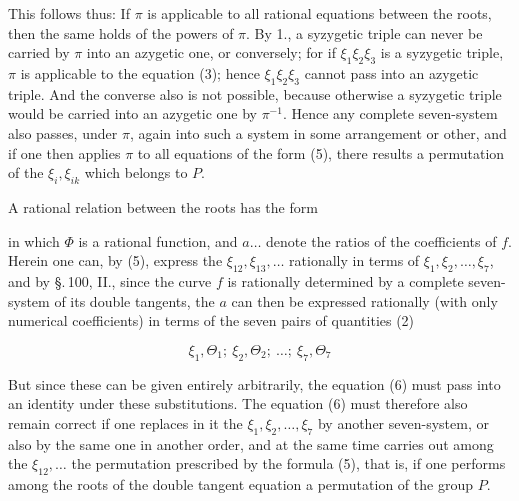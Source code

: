 
This follows thus: If $\pi$ is applicable to all rational equations between the roots, then the same holds of the powers of $\pi$. By 1., a syzygetic triple can never be carried by $\pi$ into an azygetic one, or conversely; for if $\xi_1\xi_2\xi_3$ is a syzygetic triple, $\pi$ is applicable to the equation (3); hence $\xi_1\xi_2\xi_3$ cannot pass into an azygetic triple. And the converse also is not possible, because otherwise a syzygetic triple would be carried into an azygetic one by $\pi^{-1}$. Hence any complete seven-system also passes, under $\pi$, again into such a system in some arrangement or other, and if one then applies $\pi$ to all equations of the form (5), there results a permutation of the $\xi_i, \xi_{ik}$ which belongs to $P$.


A rational relation between the roots has the form


in which $\Phi$ is a rational function, and $a\dots$ denote the ratios of the coefficients of $f$. Herein one can, by (5), express the $\xi_{12},\xi_{13},\dots$ rationally in terms of $\xi_1,\xi_2,\dots,\xi_7$, and by \S.\,100, II., since the curve $f$ is rationally determined by a complete seven-system of its double tangents, the $a$ can then be expressed rationally (with only numerical coefficients) in terms of the seven pairs of quantities (2)

\[
\xi_1, \Theta_1;\ \xi_2, \Theta_2;\ \dots;\ \xi_7, \Theta_7
\]

But since these can be given entirely arbitrarily, the equation (6) must pass into an identity under these substitutions. The equation (6) must therefore also remain correct if one replaces in it the $\xi_1,\xi_2,\dots,\xi_7$ by another seven-system, or also by the same one in another order, and at the same time carries out among the $\xi_{12},\dots$ the permutation prescribed by the formula (5), that is, if one performs among the roots of the double tangent equation a permutation of the group $P$.
